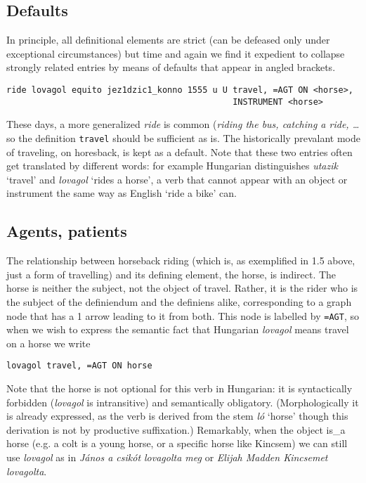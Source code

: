 \documentclass[11pt,bookmarks,bookmarksnumbered,naturalnames,plainpages=false,pdftex,colorlinks=true,urlcolor=blue,bookmarksdepth=subsection,plainpages=false]{paper}
\begin{document}
\subsection{Defaults}\label{default}

In principle, all definitional elements are strict (can be defeased only under
exceptional circumstances) but time and again we find it expedient to collapse 
strongly related entries by means of defaults that appear in angled brackets. 

\begin{verbatim}
ride lovagol equito jez1dzic1_konno 1555 u U travel, =AGT ON <horse>, 
                                             INSTRUMENT <horse>
\end{verbatim}

These days, a more generalized {\it ride} is common ({\it riding the bus,
  catching a ride, \ldots} so the definition {\tt travel} should be sufficient
as is. The historically prevalant mode of traveling, on horesback, is kept as
a default. Note that these two entries often get translated by different
words: for example Hungarian distinguishes {\it utazik} `travel' and {\it
  lovagol} `rides a horse', a verb that cannot appear with an object or
instrument the same way as English `ride a bike' can.  

\subsection{Agents, patients}\label{agtpat}

The relationship between horseback riding (which is, as exemplified in 1.5
above, just a form of travelling) and its defining element, the horse, is
indirect. The horse is neither the subject, not the object of travel. 
Rather, it is the rider who is the subject of the definiendum and the
definiens alike, corresponding to a graph node that has a 1 arrow leading to
it from both. This node is labelled by {\tt =AGT}, so when we wish to express 
the semantic fact that Hungarian {\it lovagol} means travel on a horse we
write 

\begin{verbatim}
lovagol travel, =AGT ON horse
\end{verbatim} 

\noindent
Note that the horse is not optional for this verb in Hungarian: it is
syntactically forbidden ({\it lovagol} is intransitive) and semantically
obligatory. (Morphologically it is already expressed, as the verb is derived
from the stem {\it l\'o} `horse' though this derivation is not by productive
suffixation.) Remarkably, when the object is\_a horse (e.g. a colt is a young
horse, or a specific horse like Kincsem) we can still use {\it lovagol} as in
{\it J\'anos a csik\'ot lovagolta meg} or {\it Elijah Madden Kincsemet
  lovagolta}.
\end{document}
